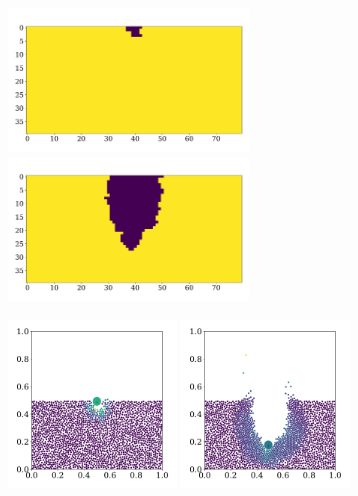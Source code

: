 \documentclass{article}
\begin{document}
    \begin{figure}[H]
        \centering
        \begin{subfigure}{.4\textwidth}                    
            \includegraphics[width=0.7\textwidth]{../plots/problem4_2/crater0.pdf}
            \includegraphics[width=0.7\textwidth]{../plots/problem4_2/crater19.pdf}
        \end{subfigure}
        \begin{subfigure}{.59\textwidth}                    
            \includegraphics[width=0.49\textwidth]{../plots/problem4_2/particles0.pdf}
            \includegraphics[width=0.49\textwidth]{../plots/problem4_2/particles19.pdf}

\end{subfigure}
\end{figure}
\end{document}
